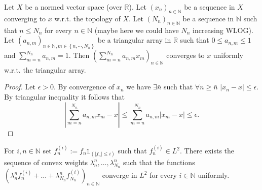 



\begin{lemma}\label{lem:convex_of_converg_seq_is_converg}
  Let $X$ be a normed vector space (over $\mathbb{R}$).
  Let $(x_n)_{n\in\mathbb{N}}$ be a sequence in $X$ converging to $x$ w.r.t. the topology of $X$.
  Let $(N_n)_{n\in\mathbb{N}}$ be a sequence in $\mathbb{N}$ such that $n\leq N_n$ for every $n\in\mathbb{N}$ (maybe here we could have $N_n$ increasing WLOG).
  Let $(a_{n,m})_{n\in\mathbb{N},m\in\left\lbrace n,\cdots,N_n\right\rbrace}$ be a triangular array in $\mathbb{R}$ such that $0\leq a_{n,m}\leq 1$ and $\sum_{m=n}^{N_n}a_{n,m}=1$.
  Then $(\sum_{m=n}^{N_n}a_{n,m}x_m)_{n\in\mathbb{N}}$ converges to $x$ uniformly w.r.t. the triangular array.
\end{lemma}

\begin{proof}
  Let $\epsilon>0$.
  By convergence of $x_n$ we have $\exists \bar{n}$ such that $\forall n\geq\bar{n}$ $|x_n-x|\leq \epsilon$.
  By triangular inequality it follows that
  $$
  |\sum_{m=n}^{N_n}a_{n,m}x_m - x|\leq \sum_{m=n}^{N_n}a_{n,m}|x_m-x|\leq\epsilon.
  $$
\end{proof}


\begin{lemma}\label{lem:komlos_convex_aux}
  For $i,n\in\mathbb{N}$ set $f_{n}^{(i)}:=f_n \mathbb{1}_{(|f_n|\leq i)}$ such that $f_{n}^{(i)}\in L^2$.
  There exists the sequence of convex weights $\lambda_n^{n}, \ldots, \lambda_{N_n}^{n}$ such that the functions
  $ (\lambda_n^{n} f_n^{(i)} + \ldots+\lambda_{N_n}^{n} f_{N_n}^{(i)})_{n\in\mathbb{N}}$
  converge in $L^2$ for every $i\in\mathbb{N}$ uniformly.
\end{lemma}

